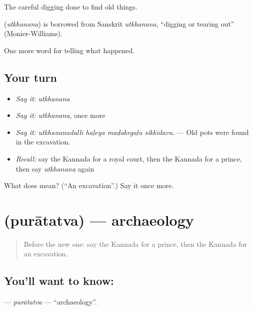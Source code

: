 The careful digging done to find old things.

\begin{cousinweb}
\textbf{} (\emph{utkhanana}) is borrowed from Sanskrit \emph{utkhanana}, \textquotedblleft{}digging or tearing out\textquotedblright{} (Monier-Williams).
\end{cousinweb}

\begin{grammarlens}[title={What you've built}]
One more word for telling what happened.
\end{grammarlens}

\subsection*{Your turn}
\begin{itemize}
\raggedright
  \item \emph{Say it:} \emph{utkhanana}
  \item \emph{Say it:} \emph{utkhanana}, once more
  \item \emph{Say it:} \emph{utkhananadalli haḷeya maḍakegaḷu sikkidavu.} — Old pots were found in the excavation.
  \item \emph{Recall:} say the Kannada for a royal court, then the Kannada for a prince, then say \emph{utkhanana} again
\end{itemize}

\begin{tcolorbox}[breakable,colback=teal!4,colframe=teal!35!black,title={Before you move on}]
What does  mean? (\textquotedblleft{}An excavation\textquotedblright{}.) Say it once more.
\end{tcolorbox}
\section[\texorpdfstring{\kn{ಪುರಾತತ್ವ} (purātatva)}{ಪುರಾತತ್ವ (purātatva)}]{ (purātatva) — archaeology}

\label{lesson:KA-C355-puratatva}



\begin{quote}
Before the new one: say the Kannada for a prince, then the Kannada for an excavation.
\end{quote}

\subsection*{You'll want to know: }
\textbf{} — \emph{purātatva} — \textquotedblleft{}archaeology\textquotedblright{}.

